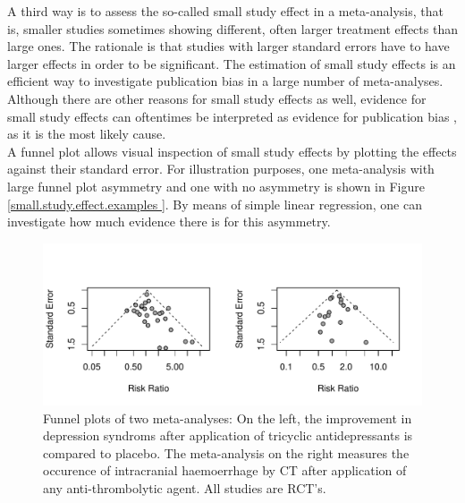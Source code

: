 \documentclass[11pt,a4paper,twoside]{book}\usepackage[]{graphicx}\usepackage[]{color}
\makeatletter
\def\maxwidth{ %
  \ifdim\Gin@nat@width>\linewidth
    \linewidth
  \else
    \Gin@nat@width
  \fi
}
\newenvironment{knitrout}{}{} %
\makeatother
\begin{document}
A third way is to assess the so-called small study effect in a meta-analysis, that is, smaller studies sometimes showing different, often larger treatment effects than large ones. The rationale is that studies with larger standard errors have to have larger effects in order to be significant. The estimation of small study effects is an efficient way to investigate publication bias in a large number of meta-analyses. Although there are other reasons for small study effects as well, evidence for small study effects can oftentimes be interpreted as evidence for publication bias \citep{Egger}, as it is the most likely cause. \\
% 
% 
A funnel plot \citep{funnel.plot} allows visual inspection of small study effects by plotting the effects against their standard error. For illustration purposes, one meta-analysis with large funnel plot asymmetry and one with no asymmetry is shown in Figure \ref{small.study.effect.examples }. %
By means of simple linear regression, one can investigate how much evidence there is for this asymmetry. 

\begin{figure}
\begin{knitrout}
\color{fgcolor}
\includegraphics[width=\maxwidth]{figure/unnamed-chunk-1-1} 

\end{knitrout}
\caption{Funnel plots of two meta-analyses: On the left, the improvement in depression syndroms after application of tricyclic antidepressants is compared to placebo. The meta-analysis on the right measures the occurence of intracranial haemoerrhage by CT after application of any anti-thrombolytic agent. All studies are RCT's.}
\label{small.study.effect.examples}
\end{figure}
\end{document}

